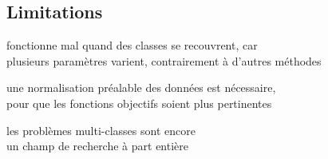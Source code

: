 \subsection{Limitations}


\begin{itmz}

\item{fonctionne mal quand des classes se recouvrent, car\\
plusieurs paramètres varient, contrairement à d’autres méthodes}

\end{itmz}\begin{itmz}

\item{une normalisation préalable des données est nécessaire,\\
pour que les fonctions objectifs soient plus pertinentes}

\end{itmz}\begin{itmz}

\item{les problèmes multi-classes sont encore\\
un champ de recherche à part entière}

\end{itmz}


\pagebreak
